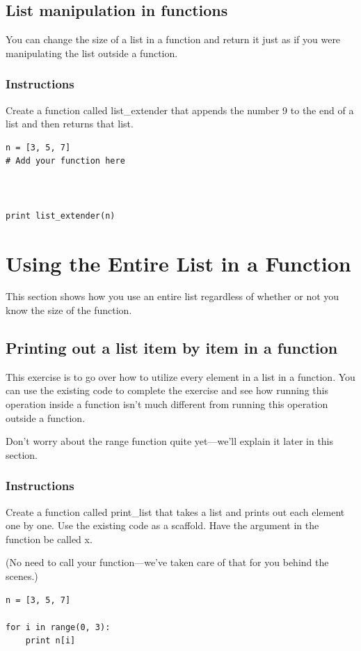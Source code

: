 \documentclass[12pt,a4paper,final,twoside,onecolumn,titlepage]{book}
\begin{document}
\subsection{List manipulation in functions}

You can change the size of a list in a function and return it just as if you were manipulating the list outside a function.
\subsubsection{Instructions}

Create a function called list\_extender that appends the number 9 to the end of a list and then returns that list.
\begin{lstlisting}
n = [3, 5, 7]
# Add your function here



print list_extender(n)
\end{lstlisting}

\section{Using the Entire List in a Function}
This section shows how you use an entire list regardless of whether or not you know the size of the function.
\subsection{Printing out a list item by item in a function}

This exercise is to go over how to utilize every element in a list in a function. You can use the existing code to complete the exercise and see how running this operation inside a function isn't much different from running this operation outside a function.

Don't worry about the range function quite yet—we'll explain it later in this section.
\subsubsection{Instructions}

Create a function called print\_list that takes a list and prints out each element one by one. Use the existing code as a scaffold. Have the argument in the function be called x.

(No need to call your function—we've taken care of that for you behind the scenes.)
\begin{lstlisting}
n = [3, 5, 7]

for i in range(0, 3):
    print n[i]
\end{lstlisting}
\end{document}

